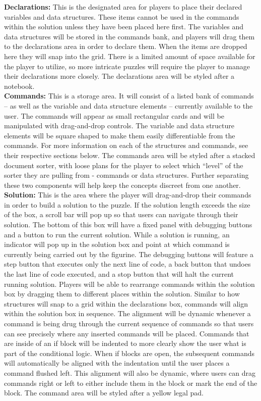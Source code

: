 \textbf{Declarations:}
This is the designated area for players to place their declared variables and data structures. These items cannot 
be used in the commands within the solution unless they have been placed here first. The variables and data 
structures will be stored in the commands bank, and players will drag them to the declarations area in order to 
declare them. When the items are dropped here they will snap into the grid. There is a limited amount of space 
available for the player to utilize, so more intricate puzzles will require the player to manage their declarations 
more closely. The declarations area will be styled after a notebook.\\

\textbf{Commands:}
This is a storage area. It will consist of a listed bank of commands -- as well as the variable and data structure 
elements -- currently available to the user. The commands will appear as small rectangular cards and will be 
manipulated with drag-and-drop controls. The variable and data structure elements will be square shaped to 
make them easily differentiable from the commands. For more information on each of the structures and 
commands, see their respective sections below. The commands area will be styled after a stacked document 
sorter, with loose plans for the player to select which “level” of the sorter they are pulling from - commands 
or data structures. Further separating these two components will help keep the concepts discreet from one 
another.\\

\textbf{Solution:}
This is the area where the player will drag-and-drop their commands in order to build a solution to the puzzle. 
If the solution length exceeds the size of the box, a scroll bar will pop up so that users can navigate through 
their solution. The bottom of this box will have a fixed panel with debugging buttons and a button to run the 
current solution. While a solution is running, an indicator will pop up in the solution box and point at which 
command is currently being carried out by the figurine. The debugging buttons will feature a step button that 
executes only the next line of code, a back button that undoes the last line of code executed, and a stop button 
that will halt the current running solution. Players will be able to rearrange commands within the solution box by 
dragging them to different places within the solution. Similar to how structures will snap to a grid within the 
declarations box, commands will align within the solution box in sequence. The alignment will be dynamic 
whenever a command is being drug through the current sequence of commands so that users can see precisely 
where any inserted commands will be placed. Commands that are inside of an if block will be indented to more 
clearly show the user what is part of the conditional logic. When if blocks are open, the subsequent commands 
will automatically be aligned with the indentation until the user places a command flushed left. This alignment will 
also be dynamic, where users can drag commands right or left to either include them in the block or mark the 
end of the block. The command area will be styled after a yellow legal pad.\\


